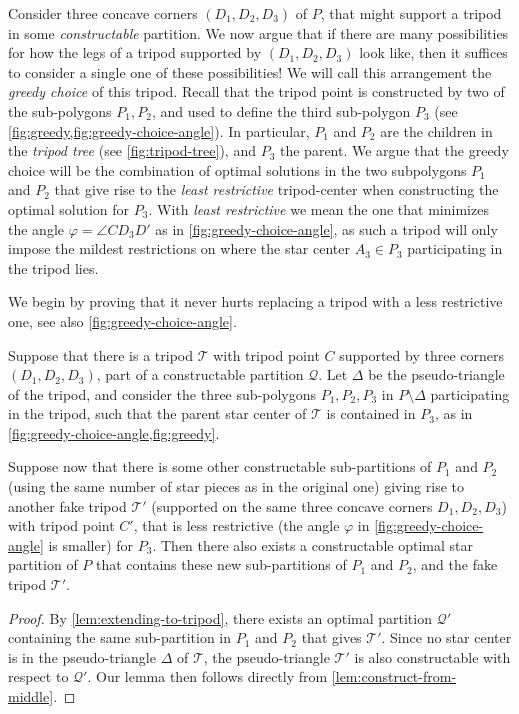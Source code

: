 \documentclass{theoretics}
\begin{document}
Consider three concave corners $(D_1, D_2, D_3)$ of $P$, that might support a tripod in some \emph{constructable} partition.
We now argue that if there are many possibilities for how the legs of a tripod supported by $(D_1, D_2, D_3)$ look like, then it suffices to consider a single one of these possibilities! We will call this arrangement the \emph{greedy choice} of this tripod. Recall that the tripod point is constructed by two of the sub-polygons $P_1,P_2$, and used to define the third sub-polygon $P_3$ (see \cref{fig:greedy,fig:greedy-choice-angle}). In particular, $P_1$ and $P_2$ are the children in the \emph{tripod tree} (see \cref{fig:tripod-tree}), and $P_3$ the parent. We argue that the greedy choice will be the combination of optimal solutions in the two subpolygons $P_1$ and $P_2$ that give rise to the \emph{least restrictive} tripod-center when constructing the optimal solution for $P_3$. With \emph{least restrictive} we mean the one that minimizes the angle $\varphi = \angle C D_3 D'$ as in \cref{fig:greedy-choice-angle}, as such a tripod will only impose the mildest restrictions on where the star center $A_3\in P_3$ participating in the tripod lies.


We begin by proving that it never hurts replacing a tripod with a less restrictive one, see also \cref{fig:greedy-choice-angle}. 
\begin{lemma}
\label{lem:less-restrictive}
Suppose that there is a tripod $\mathcal{T}$ with tripod point $C$ supported by three corners $(D_1,D_2,D_3)$, part of a constructable partition $\mathcal{Q}$.
Let $\Delta$ be the pseudo-triangle of the tripod, and consider the three sub-polygons $P_1, P_2, P_3$ in $P\setminus \Delta$ participating in the tripod, such that the parent star center of $\mathcal{T}$ is contained in $P_3$, as in \cref{fig:greedy-choice-angle,fig:greedy}.

Suppose now that there is some other constructable sub-partitions of $P_1$ and $P_2$ (using the same number of star pieces as in the original one) giving rise to another fake tripod $\mathcal{T}'$ (supported on the same three concave corners $D_1, D_2, D_3$) with tripod point $C'$, that is less restrictive (the angle $\varphi$ in \cref{fig:greedy-choice-angle} is smaller) for $P_3$. Then there also exists a constructable optimal star partition of $P$ that contains these new sub-partitions of $P_1$ and $P_2$, and the fake tripod $\mathcal{T}'$.
\end{lemma}

\begin{proof}
    By \cref{lem:extending-to-tripod}, there exists an optimal partition $\mathcal{Q}'$ containing the same sub-partition in $P_1$ and $P_2$ that gives $\mathcal{T}'$. Since no star center is in the pseudo-triangle $\Delta$ of $\mathcal{T}$, the pseudo-triangle $\mathcal{T}'$ is also constructable with respect to $\mathcal{Q}'$. 
    Our lemma then follows directly from \cref{lem:construct-from-middle}.
\end{proof}
\end{document}
